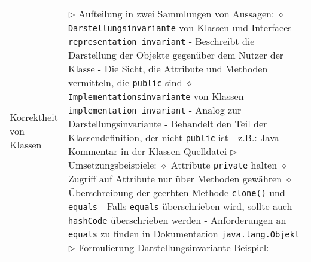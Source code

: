 \begin{longtable}{ | p{} p{} | }
	\makecell[l]{Korrektheit von \\ Klassen} & \makecell[l]{
	$\rhd$ Aufteilung in zwei Sammlungen von Aussagen: \\
	\hspace{0.4cm} $\diamond$ \texttt{Darstellungsinvariante} von Klassen und Interfaces \\
	\hspace{0.6cm} - \texttt{representation invariant} \\
	\hspace{0.6cm} - Beschreibt die Darstellung der Objekte gegenüber dem Nutzer der Klasse \\
	\hspace{0.6cm} - Die Sicht, die Attribute und Methoden vermitteln, die \texttt{public} sind \\
	\hspace{0.4cm} $\diamond$ \texttt{Implementationsinvariante} von Klassen \\
	\hspace{0.6cm} - \texttt{implementation invariant} \\
	\hspace{0.6cm} - Analog zur Darstellungsinvariante \\
	\hspace{0.6cm} - Behandelt den Teil der Klassendefinition, der nicht \texttt{public} ist \\
	\hspace{0.6cm} - z.B.: Java-Kommentar in der Klassen-Quelldatei \\
	$\rhd$ Umsetzungsbeispiele: \\
	\hspace{0.4cm} $\diamond$ Attribute \texttt{private} halten \\
	\hspace{0.4cm} $\diamond$ Zugriff auf Attribute nur über Methoden gewähren \\
	\hspace{0.4cm} $\diamond$ Überschreibung der geerbten Methode \texttt{clone()} und \texttt{equals} \\
	\hspace{0.6cm} - Falls \texttt{equals} überschrieben wird, sollte auch \texttt{hashCode} überschrieben werden \\
	\hspace{0.6cm} - Anforderungen an \texttt{equals} zu finden in Dokumentation \texttt{java.lang.Objekt} \\
	$\rhd$ Formulierung Darstellungsinvariante Beispiel: \\
}
\end{longtable}
